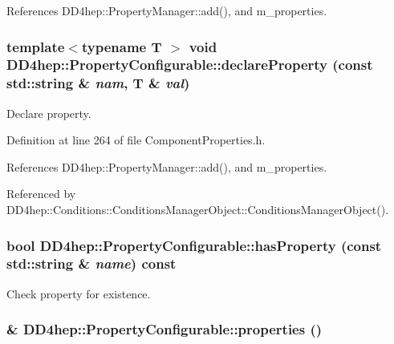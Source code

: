 References DD4hep::PropertyManager::add(), and m\_\-properties.\hypertarget{class_d_d4hep_1_1_property_configurable_af643f6873cc19432e566ecc1ba494c1d}{
\subsubsection[{declareProperty}]{\setlength{\rightskip}{0pt plus 5cm}template$<$typename T $>$ void DD4hep::PropertyConfigurable::declareProperty (const std::string \& {\em nam}, \/  {\bf T} \& {\em val})}}
\label{class_d_d4hep_1_1_property_configurable_af643f6873cc19432e566ecc1ba494c1d}


Declare property. 

Definition at line 264 of file ComponentProperties.h.

References DD4hep::PropertyManager::add(), and m\_\-properties.

Referenced by DD4hep::Conditions::ConditionsManagerObject::ConditionsManagerObject().\hypertarget{class_d_d4hep_1_1_property_configurable_a8c9ca33891ffe0f45045d31a9883e90c}{
\subsubsection[{hasProperty}]{\setlength{\rightskip}{0pt plus 5cm}bool DD4hep::PropertyConfigurable::hasProperty (const std::string \& {\em name}) const}}
\label{class_d_d4hep_1_1_property_configurable_a8c9ca33891ffe0f45045d31a9883e90c}


Check property for existence. \hypertarget{class_d_d4hep_1_1_property_configurable_af6f3ad08d1cb9d831d8f89255c403d1c}{
\subsubsection[{properties}]{\& DD4hep::PropertyConfigurable::properties ()}}
\label{class_d_d4hep_1_1_property_configurable_af6f3ad08d1cb9d831d8f89255c403d1c}


